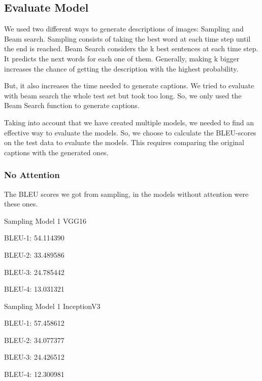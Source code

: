 \documentclass{article} %
\begin{document}
\subsection{Evaluate Model}

We used two different ways to generate descriptions of images: Sampling and Beam search. Sampling consists of taking the best word at each time step until the end is reached. Beam Search considers the k best sentences at each time step. It predicts the next words for each one of them. Generally, making k bigger increases the chance of getting the description with the highest probability. 

But, it also increases the time needed to generate captions. We tried to evaluate with beam search the whole test set but took too long. So, we only used the Beam Search function to generate captions. 

Taking into account that we have created multiple models, we needed to find an effective way to evaluate the models. So, we choose to calculate the BLEU-scores on the test data to evaluate the models. This requires comparing the original captions with the generated ones.

\subsubsection{No Attention}
The BLEU scores we got from sampling, in the models without attention were these ones.

\begin{itemize}
\begin{multicols}{2}
    \item Sampling Model 1 VGG16
    \item BLEU-1: 54.114390
    \item BLEU-2: 33.489586
    \item BLEU-3: 24.785442
    \item BLEU-4: 13.031321
    \item Sampling Model 1 InceptionV3
    \item BLEU-1: 57.458612
    \item BLEU-2: 34.077377
    \item BLEU-3: 24.426512
    \item BLEU-4: 12.300981 
\end{multicols}
\end{itemize}
\end{document}
